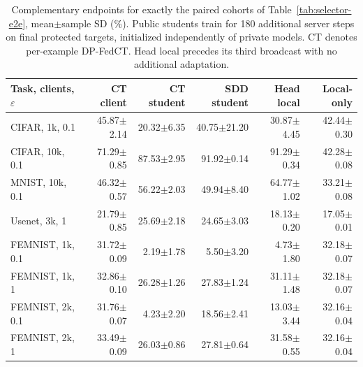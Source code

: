 \begin{table}[t]
\caption{Complementary endpoints for exactly the paired cohorts of Table~\ref{tab:selector-e2e}, mean$\pm$sample SD (\%). Public students train for 180 additional server steps on final protected targets, initialized independently of private models. CT denotes per-example DP-FedCT. Head local precedes its third broadcast with no additional adaptation.}
\label{tab:selector-readouts}\small
\centering
\begin{tabular}{@{}lrrrrr@{}}\toprule
Task, clients, $\varepsilon$ & CT client & CT student & SDD student & Head local & Local-only \\
\midrule
CIFAR, 1k, 0.1 & 45.87$\pm$2.14 & 20.32$\pm$6.35 & 40.75$\pm$21.20 & 30.87$\pm$4.45 & 42.44$\pm$0.30 \\
CIFAR, 10k, 0.1 & 71.29$\pm$0.85 & 87.53$\pm$2.95 & 91.92$\pm$0.14 & 91.29$\pm$0.34 & 42.28$\pm$0.08 \\
MNIST, 10k, 0.1 & 46.32$\pm$0.57 & 56.22$\pm$2.03 & 49.94$\pm$8.40 & 64.77$\pm$1.02 & 33.21$\pm$0.08 \\
Usenet, 3k, 1 & 21.79$\pm$0.85 & 25.69$\pm$2.18 & 24.65$\pm$3.03 & 18.13$\pm$0.20 & 17.05$\pm$0.01 \\
FEMNIST, 1k, 0.1 & 31.72$\pm$0.09 & 2.19$\pm$1.78 & 5.50$\pm$3.20 & 4.73$\pm$1.80 & 32.18$\pm$0.07 \\
FEMNIST, 1k, 1 & 32.86$\pm$0.10 & 26.28$\pm$1.26 & 27.83$\pm$1.24 & 31.11$\pm$1.48 & 32.18$\pm$0.07 \\
FEMNIST, 2k, 0.1 & 31.76$\pm$0.07 & 4.23$\pm$2.20 & 18.56$\pm$2.41 & 13.03$\pm$3.44 & 32.16$\pm$0.04 \\
FEMNIST, 2k, 1 & 33.49$\pm$0.09 & 26.03$\pm$0.86 & 27.81$\pm$0.64 & 31.58$\pm$0.55 & 32.16$\pm$0.04 \\
\bottomrule\end{tabular}
\end{table}
